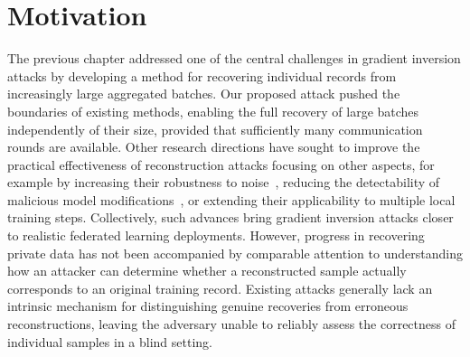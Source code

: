 \section{Motivation}


The previous chapter addressed one of the central challenges in gradient inversion attacks by developing a method for recovering individual records from increasingly large aggregated batches. Our proposed attack pushed the boundaries of existing methods, enabling the full recovery of large batches independently of their size, provided that sufficiently many communication rounds are available. Other research directions have sought to improve the practical effectiveness of reconstruction attacks focusing on other aspects, for example by increasing their robustness to noise~\cite{shiScaleMIAScalableModel2025}, reducing the detectability of malicious model modifications~\cite{garovHidingPlainSight2024}, or extending their applicability to multiple local training steps. Collectively, such advances bring gradient inversion attacks closer to realistic federated learning deployments. However, progress in recovering private data has not been accompanied by comparable attention to understanding how an attacker can determine whether a reconstructed sample actually corresponds to an original training record. Existing attacks generally lack an intrinsic mechanism for distinguishing genuine recoveries from erroneous reconstructions, leaving the adversary unable to reliably assess the correctness of individual samples in a blind setting.

